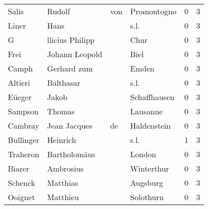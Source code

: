 \begin{tabular}{llllrr}
                    Salis &                             Rudolf &         von &                                 Promontogno &          0 &         3 \\
                    Liner &                               Hans &             &                                        s.l. &          0 &         3 \\
                        G &                    llicius Philipp &             &                                        Chur &          0 &         3 \\
                     Frei &                     Johann Leopold &             &                                        Biel &          0 &         3 \\
                    Camph &                        Gerhard zum &             &                                       Emden &          0 &         3 \\
                  Altieri &                          Balthasar &             &                                        s.l. &          0 &         3 \\
                   Eüeger &                              Jakob &             &                                Schaffhausen &          0 &         3 \\
                  Sampson &                             Thomas &             &                                    Lausanne &          0 &         3 \\
                  Cambray &                       Jean Jacques &          de &                                 Haldenstein &          0 &         3 \\
                Bullinger &                           Heinrich &             &                                        s.l. &          1 &         3 \\
                 Traheron &                       Bartholomäus &             &                                      London &          0 &         3 \\
                   Biarer &                          Ambrosius &             &                                  Winterthur &          0 &         3 \\
                  Schenck &                           Matthias &             &                                    Augsburg &          0 &         3 \\
                  Ooignet &                           Matthieu &             &                                   Solothurn &          0 &         3 \\

\end{tabular}
